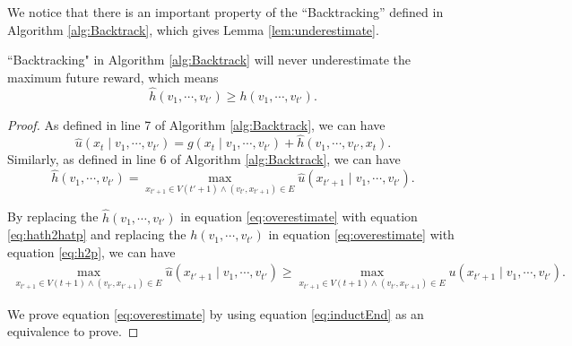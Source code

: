 \documentclass[12pt]{article}
\begin{document}
We notice that there is an important property of the ``Backtracking'' defined in Algorithm \ref{alg:Backtrack}, which gives Lemma \ref{lem:underestimate}.

\begin{lem}
\label{lem:underestimate}
``Backtracking" in Algorithm \ref{alg:Backtrack} will never underestimate the maximum future reward, which means 
\begin{equation}
\label{eq:overestimate}
\hat{h}( v_{1} , \cdots , v_{t'} ) \geq h( v_{1} , \cdots , v_{t'} ).
\end{equation}
\begin{proof}


As defined in line 7 of Algorithm \ref{alg:Backtrack}, we can have
\begin{equation}
\label{eq:hatp_def}
\hat{u}( x_{t} \mid v_{1} , \cdots , v_{t'} ) = g(x_{t} \mid v_{1} , \cdots , v_{t'} ) + \hat{h}(v_{1} , \cdots , v_{t'}, x_{t} ).
\end{equation}
Similarly, as defined in line 6 of Algorithm \ref{alg:Backtrack}, we can have
\begin{equation}
\label{eq:hath2hatp}
\hat{h}( v_{1} , \cdots , v_{t'} ) = \max_{x_{t'+1} \in V(t'+1) \land (v_{t'}, x_{t'+1}) \in E} \hat{u}(x_{t'+1} \mid v_{1} , \cdots , v_{t'} ).
\end{equation}

By replacing the $ \hat{h}( v_{1} , \cdots , v_{t'} ) $ in equation \eqref{eq:overestimate} with equation \eqref{eq:hath2hatp} and replacing the $ h( v_{1} , \cdots , v_{t'} ) $ in equation \eqref{eq:overestimate} with equation \eqref{eq:h2p}, we can have
\begin{equation}
\label{eq:inductEnd}
\begin{aligned}
\max_{x_{t'+1} \in V(t+1) \land (v_{t'}, x_{t'+1}) \in E } \hat{u}(x_{t'+1} \mid v_{1} , \cdots , v_{t'} ) \geq \max_{x_{t'+1} \in V(t+1) \land (v_{t'}, x_{t'+1}) \in E } u(x_{t'+1} \mid v_{1} , \cdots , v_{t'} ).
\end{aligned}
\end{equation}

We prove equation \eqref{eq:overestimate} by using equation \eqref{eq:inductEnd} as an equivalence to prove.


\end{proof}
\end{lem}
\end{document}
